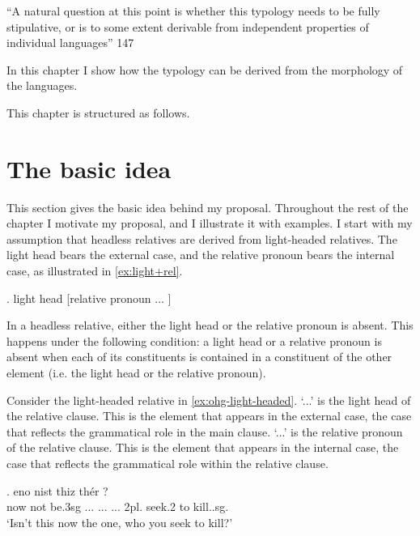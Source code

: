 ``A natural question at this point is whether this typology needs to be fully stipulative, or is to some extent derivable from independent properties of individual languages'' \citet{grosu1994}{147}

In this chapter I show how the typology can be derived from the morphology of the languages.

This chapter is structured as follows.


\section{The basic idea}\label{sec:basic-idea}

This section gives the basic idea behind my proposal. Throughout the rest of the chapter I motivate my proposal, and I illustrate it with examples.
I start with my assumption that headless relatives are derived from light-headed relatives. The light head bears the external case, and the relative pronoun bears the internal case, as illustrated in \ref{ex:light+rel}.

\ex. light head [relative pronoun ... ]\label{ex:light+rel}

In a headless relative, either the light head or the relative pronoun is absent.
This happens under the following condition: a light head or a relative pronoun is absent when each of its constituents is contained in a constituent of the other element (i.e. the light head or the relative pronoun).

Consider the light-headed relative in \ref{ex:ohg-light-headed}.
 `...' is the light head of the relative clause. This is the element that appears in the external case, the case that reflects the grammatical role in the main clause.
 `...' is the relative pronoun of the relative clause. This is the element that appears in the internal case, the case that reflects the grammatical role within the relative clause.

\exg. eno nist thiz thér     ?\\
 now {not be.3\ac{sg}} ... ...
 ... 2\ac{pl}. seek.2 to kill..\ac{sg}.\\
 `Isn't this now the one, who you seek to kill?'\label{ex:ohg-light-headed}


